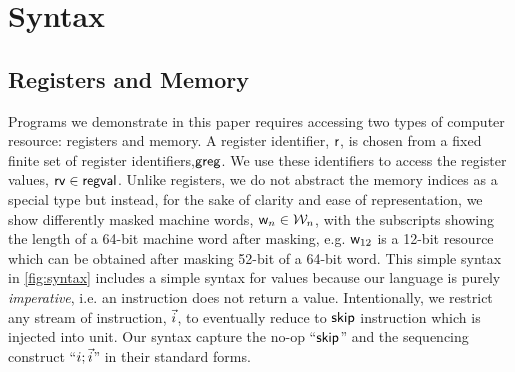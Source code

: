 \section{Syntax}
\label{sec:syntax}
\subsection{Registers and Memory}
Programs we demonstrate in this paper requires accessing two types of computer resource: registers and memory. A register identifier, $\mathsf{r}$, is chosen from a fixed finite set of register identifiers,$\mathsf{greg}$. We use these identifiers to access the register values, $\mathsf{rv} \in \mathsf{regval}$. Unlike registers, we do not abstract the memory indices as a special type but instead, for the sake of clarity and ease of representation, we show differently masked machine words, $\mathsf{w}_n \in \mathcal{W}_n$, with the subscripts showing the length of a 64-bit machine word after masking, e.g. $\mathsf{w}_{12}$ is a 12-bit resource which can be obtained after masking 52-bit of a 64-bit word.
This simple syntax in \ref{fig:syntax} includes a simple syntax for values because our language is purely \textit{imperative}, i.e. an instruction does not return a value. Intentionally, we restrict any stream of instruction, $\vec{i}$, to eventually reduce to $\mathsf{skip}$ instruction which is injected into unit. Our syntax capture the no-op ``$\mathsf{skip}$'' and the sequencing construct ``$i; \vec{i}$'' in their standard forms.

